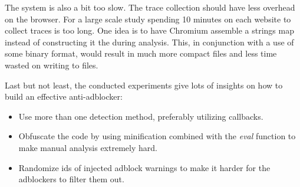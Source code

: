 The system is also a bit too slow. The trace collection should have less overhead on the browser. 
For a large scale study spending 10 minutes on each website to collect traces is too long.
One idea is to have Chromium assemble a strings map instead of constructing it the during analysis. 
This, in conjunction with a use of some binary format, would
result in much more compact files and less time wasted on writing to files.

Last but not least, the conducted experiments give lots of insights on how to build an effective anti-adblocker:
\begin{itemize}
  \item Use more than one detection method, preferably utilizing callbacks.
  \item Obfuscate the code by using minification combined with the \emph{eval} function to make manual analysis extremely hard.
  \item Randomize ids of injected adblock warnings to make it harder for the adblockers to filter them out.
\end{itemize}
